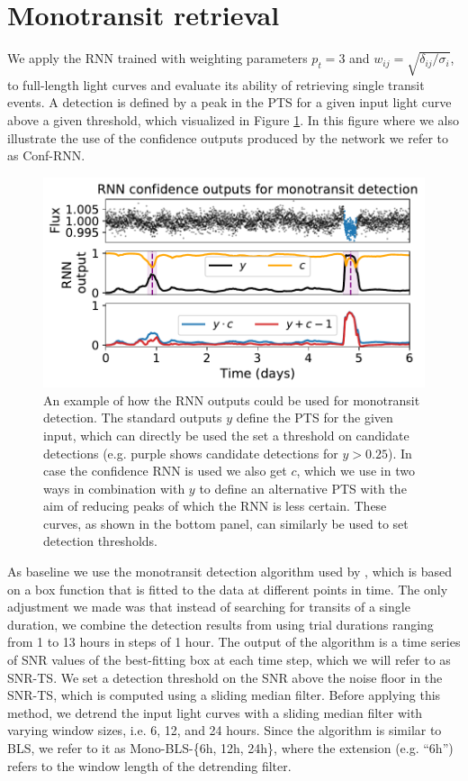 
\section{Monotransit retrieval}
\label{sec:monos}

We apply the RNN trained with weighting parameters $p_t=3$ and $w_{ij} = \sqrt{\delta_{ij}/\sigma_i}$, to full-length light curves and evaluate its ability of retrieving single transit events. A detection is defined by a peak in the PTS for a given input light curve above a given threshold, which visualized in Figure \ref{fig:mono_example}. In this figure where we also illustrate the use of the confidence outputs produced by the network we refer to as Conf-RNN. 

\begin{figure}
    \centering
    \includegraphics[width=0.5\linewidth]{Experiments/Figures/Monos/mono_example.pdf}
    \caption{An example of how the RNN outputs could be used for monotransit detection. The standard outputs $y$ define the PTS for the given input, which can directly be used the set a threshold on candidate detections (e.g. purple shows candidate detections for $y >0.25$). In case the confidence RNN is used we also get $c$, which we use in two ways in combination with $y$ to define an alternative PTS with the aim of reducing peaks of which the RNN is less certain. These curves, as shown in the bottom panel, can similarly be used to set detection thresholds.}
    \label{fig:mono_example}
\end{figure}

As baseline we use the monotransit detection algorithm used by \cite{foreman2016population}, which is based on a box function that is fitted to the data at different points in time. The only adjustment we made was that instead of searching for transits of a single duration, we combine the detection results from using trial durations ranging from 1 to 13 hours in steps of 1 hour. The output of the algorithm is a time series of SNR values of the best-fitting box at each time step, which we will refer to as SNR-TS. We set a detection threshold on the SNR above the noise floor in the SNR-TS, which is computed using a sliding median filter. Before applying this method, we detrend the input light curves with a sliding median filter with varying window sizes, i.e. 6, 12, and 24 hours. Since the algorithm is similar to BLS, we refer to it as Mono-BLS-\{6h, 12h, 24h\}, where the extension (e.g. ``6h'') refers to the window length of the detrending filter.

